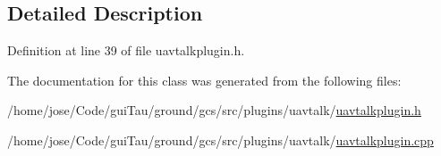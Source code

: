 \subsection{Detailed Description}


Definition at line 39 of file uavtalkplugin.\-h.



The documentation for this class was generated from the following files\-:\begin{DoxyCompactItemize}
\item 
/home/jose/\-Code/gui\-Tau/ground/gcs/src/plugins/uavtalk/\hyperlink{uavtalkplugin_8h}{uavtalkplugin.\-h}\item 
/home/jose/\-Code/gui\-Tau/ground/gcs/src/plugins/uavtalk/\hyperlink{uavtalkplugin_8cpp}{uavtalkplugin.\-cpp}\end{DoxyCompactItemize}
